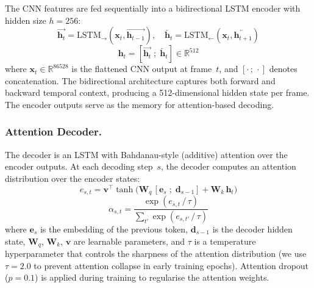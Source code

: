 \documentclass[runningheads]{llncs}
\begin{document}
The CNN features are fed sequentially into a bidirectional LSTM
encoder with hidden size $h = 256$:
\begin{equation}
\overrightarrow{\mathbf{h}_t} = \mathrm{LSTM}_{\rightarrow}
  (\mathbf{x}_t, \overrightarrow{\mathbf{h}_{t-1}}), \quad
\overleftarrow{\mathbf{h}_t} = \mathrm{LSTM}_{\leftarrow}
  (\mathbf{x}_t, \overleftarrow{\mathbf{h}_{t+1}})
\label{eq:bilstm}
\end{equation}
\begin{equation}
\mathbf{h}_t = [\overrightarrow{\mathbf{h}_t} \;;\;
                 \overleftarrow{\mathbf{h}_t}]
  \in \mathbb{R}^{512}
\label{eq:concat}
\end{equation}
where $\mathbf{x}_t \in \mathbb{R}^{86528}$ is the flattened CNN
output at frame~$t$, and $[\cdot\,;\,\cdot]$ denotes concatenation.
The bidirectional architecture captures both forward and backward
temporal context, producing a 512-dimensional hidden state per
frame.
The encoder outputs serve as the memory for attention-based
decoding.

\subsubsection{Attention Decoder.}\label{sec:decoder}

The decoder is an LSTM with Bahdanau-style (additive) attention over
the encoder outputs.
At each decoding step~$s$, the decoder computes an attention
distribution over the encoder states:
\begin{equation}
e_{s,t} = \mathbf{v}^\top \tanh\!\bigl(
  \mathbf{W}_q \,[\mathbf{e}_s \;;\; \mathbf{d}_{s-1}]
  + \mathbf{W}_k \,\mathbf{h}_t
\bigr)
\label{eq:energy}
\end{equation}
\begin{equation}
\alpha_{s,t} = \frac{\exp(e_{s,t}\,/\,\tau)}
                     {\sum_{t'} \exp(e_{s,t'}\,/\,\tau)}
\label{eq:attention}
\end{equation}
where $\mathbf{e}_s$ is the embedding of the previous token,
$\mathbf{d}_{s-1}$ is the decoder hidden state,
$\mathbf{W}_q$, $\mathbf{W}_k$, $\mathbf{v}$ are learnable
parameters, and $\tau$ is a temperature hyperparameter that
controls the sharpness of the attention distribution (we use
$\tau = 2.0$ to prevent attention collapse in early training
epochs).
Attention dropout ($p = 0.1$) is applied during training to
regularise the attention weights.
\end{document}
